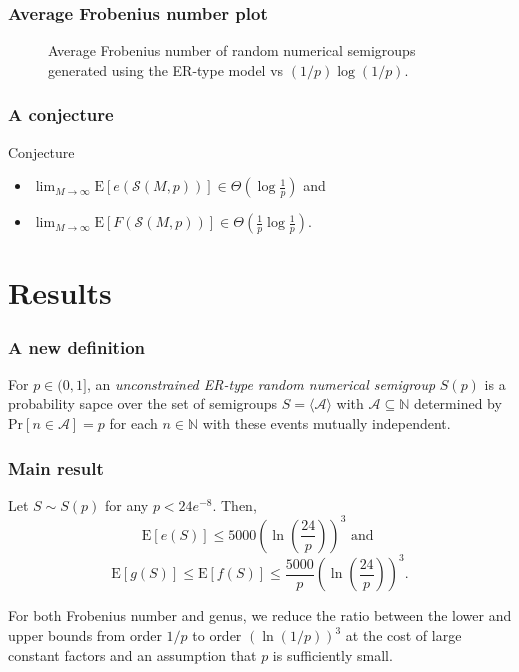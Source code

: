 \documentclass{beamer}
\def\NN{\ensuremath{\mathbb{N}}}
\def\Pr{\ensuremath{\mathrm{Pr}}}
\def\EE{\ensuremath{\mathrm{E}}}
\begin{document}
    \begin{frame}
        \frametitle{Average Frobenius number plot}
        \begin{figure}
            \begin{center}
                \scalebox{0.6}{}
            \end{center}
            \caption{Average Frobenius number of random numerical semigroups generated using the ER-type model vs $(1/p)\log(1/p)$.}
            \label{fig:frobenius}
        \end{figure}
    \end{frame}

    \begin{frame}
        \frametitle{A conjecture}
        \begin{block}{Conjecture}
            \begin{itemize}
                \item \(\lim_{M \to \infty} \EE[e(\mathcal{S}(M, p))] \in \Theta \left(\log\frac{1}{p}\right)\) and
                \item \(\lim_{M \to \infty} \EE[F(\mathcal{S}(M, p))] \in \Theta \left(\frac{1}{p}\log\frac{1}{p}\right).\)
            \end{itemize}
            
            
        \end{block}
        
    \end{frame}


\section{Results}

\begin{frame}
    \frametitle{A new definition}
    \begin{definition}\label{def:randnumsems:def}
        For $p \in (0, 1]$, an \textit{unconstrained ER-type random numerical semigroup} $S(p)$ is a probability sapce over the set of semigroups $S = \langle \mathcal{A} \rangle$ with $\mathcal{A} \subseteq \NN$ determined by $\Pr[n \in \mathcal{A}] = p$ for each $n \in \NN$ with these events mutually independent.
    \end{definition}
\end{frame}

\begin{frame}
    \frametitle{Main result}
    \begin{theorem}\label{thm:main}
        Let $S \sim S(p)$ for any $p < 24e^{-8}$. Then,
        \[\EE[e(S)] \leq 5000 \left(\ln\left(\frac{24}{p}\right)\right)^3 \text{ and }\]
        \[\EE[g(S)] \leq \EE[f(S)] \leq \frac{5000}{p} \left(\ln\left(\frac{24}{p}\right)\right)^3.\]
    \end{theorem}
    For both Frobenius number and genus, we reduce the ratio between the lower and upper bounds from order $1/p$ to order $(\ln(1/p))^3$ at the cost of large constant factors and an assumption that $p$ is sufficiently small. 
\end{frame}
\end{document}

